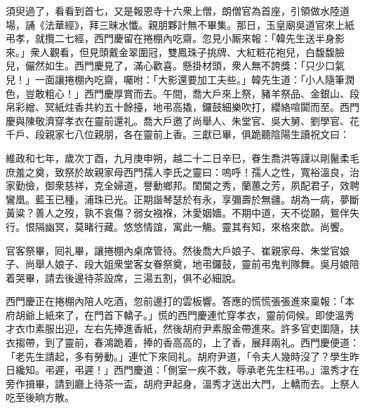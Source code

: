 須臾過了，看看到首七，又是報恩寺十六衆上僧，朗僧官為首座，引領做水陸道場，誦《法華經》，拜三昧水懺。親朋夥計無不畢集。那日，玉皇廟吳道官來上紙弔孝，就攬二七經，西門慶留在捲棚內吃齋。忽見小厮來報：「韓先生送半身影來。」衆人觀看，但見頭戴金翠圍冠，雙鳳珠子挑牌、大紅粧花袍兒，白馥馥臉兒，儼然如生。西門慶見了，滿心歡喜。懸掛材頭，衆人無不誇獎：「只少口氣兒！」一面讓捲棚內吃齋，囑咐：「大影還要加工夫些。」韓先生道：「小人隨筆潤色，豈敢粗心！」西門慶厚賞而去。午間，喬大戶來上祭，豬羊祭品、金銀山、段帛彩繒、冥紙炷香共約五十餘擡，地弔高撬，鑼鼓細樂吹打，纓絡喧闐而至。西門慶與陳敬濟穿孝衣在靈前還礼。喬大戶邀了尚舉人、朱堂官、吳大舅、劉學官、花千戶、段親家七八位親朋，各在靈前上香。三獻已畢，俱跪聽陰陽生讀祝文曰：

維政和七年，歲次丁酉，九月庚申朔，越二十二日辛巳，眷生喬洪等謹以剛鬣柔毛庶羞之奠，致祭於故親家母西門孺人李氏之靈曰：嗚呼！孺人之性，寬裕溫良，治家勤儉，御衆慈祥，克全婦道，譽動鄉邦。閨閫之秀，蘭蕙之芳，夙配君子，效聘鸞凰。藍玉已種，浦珠已光。正期諧琴瑟於有永，享彌壽於無疆。胡為一病，夢斷黃粱？善人之歿，孰不哀傷？弱女襁褓，沐愛姻嬙。不期中道，天不從願，鴛伴失行。恨隔幽冥，莫睹行藏。悠悠情誼，寓此一觴。靈其有知，來格來歆。尚饗。

官客祭畢，囘礼畢，讓捲棚內桌席管待。然後喬大戶娘子、崔親家母、朱堂官娘子、尚舉人娘子、段大姐衆堂客女眷祭奠，地弔鑼鼓，靈前弔鬼判隊舞。吳月娘陪着哭畢，請去後邊待茶設席，三湯五割，俱不必細說。

西門慶正在捲棚內陪人吃酒，忽前邊打的雲板響。答應的慌慌張張進來稟報：「本府胡爺上紙來了，在門首下轎子。」慌的西門慶連忙穿孝衣，靈前伺候。即使溫秀才衣巾素服出迎，左右先捧進香紙，然後胡府尹素服金帶進來。許多官吏圍隨，扶衣搊帶，到了靈前，春鴻跪着，捧的香高高的，上了香，展拜兩礼。西門慶便道：「老先生請起，多有勞動。」連忙下來囘礼。胡府尹道，「令夫人幾時沒了？學生昨日纔知。弔遲，弔遲！」西門慶道：「側室一疾不救，辱承老先生枉弔。」溫秀才在旁作揖畢，請到廳上待茶一盃，胡府尹起身，溫秀才送出大門，上轎而去。上祭人吃至後晌方散。

